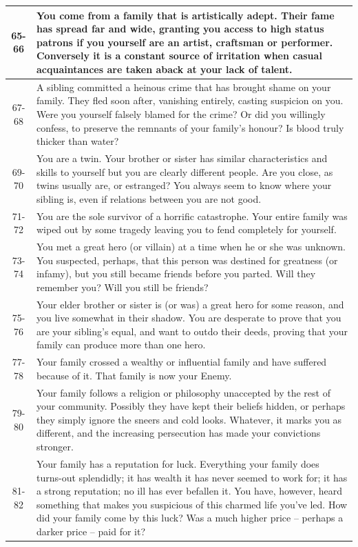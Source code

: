 \documentclass[10pt]{article}
\begin{document}
\begin{longtable}{|c|p{12cm}|}
\hline
65-66 & You come from a family that is artistically adept. Their fame has spread far and wide, granting you access to high status patrons if you yourself are an artist, craftsman or performer. Conversely it is a constant source of irritation when casual acquaintances are taken aback at your lack of talent. \\
\hline
67-68 & A sibling committed a heinous crime that has brought shame on your family. They fled soon after, vanishing entirely, casting suspicion on you. Were you yourself falsely blamed for the crime? Or did you willingly confess, to preserve the remnants of your family's honour? Is blood truly thicker than water? \\
\hline
69-70 & You are a twin. Your brother or sister has similar characteristics and skills to yourself but you are clearly different people. Are you close, as twins usually are, or estranged? You always seem to know where your sibling is, even if relations between you are not good. \\
\hline
71-72 & You are the sole survivor of a horrific catastrophe. Your entire family was wiped out by some tragedy leaving you to fend completely for yourself. \\
\hline
73-74 & You met a great hero (or villain) at a time when he or she was unknown. You suspected, perhaps, that this person was destined for greatness (or infamy), but you still became friends before you parted. Will they remember you? Will you still be friends? \\
\hline
75-76 & Your elder brother or sister is (or was) a great hero for some reason, and you live somewhat in their shadow. You are desperate to prove that you are your sibling's equal, and want to outdo their deeds, proving that your family can produce more than one hero. \\
\hline
77-78 & Your family crossed a wealthy or influential family and have suffered because of it. That family is now your Enemy. \\
\hline
79-80 & Your family follows a religion or philosophy unaccepted by the rest of your community. Possibly they have kept their beliefs hidden, or perhaps they simply ignore the sneers and cold looks. Whatever, it marks you as different, and the increasing persecution has made your convictions stronger. \\
\hline
81-82 & Your family has a reputation for luck. Everything your family does turns-out splendidly; it has wealth it has never seemed to work for; it has a strong reputation; no ill has ever befallen it. You have, however, heard something that makes you suspicious of this charmed life you've led. How did your family come by this luck? Was a much higher price – perhaps a darker price – paid for it? \\

\end{longtable}
\end{document}
